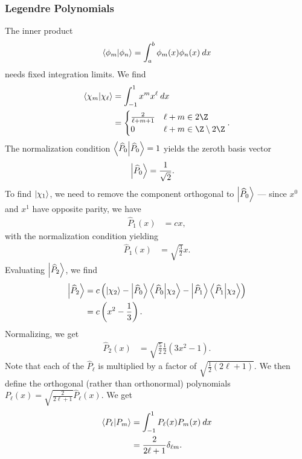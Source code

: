 \documentclass[10pt]{mypackage}
\begin{document}
\subsubsection{Legendre Polynomials}%
The inner product
\begin{align*}
  \braket{\phi_m}{\phi_n} = \int_{a}^{b} \phi_m(x)\phi_n(x)\:dx
\end{align*}
needs fixed integration limits. We find
\begin{align*}
  \braket{\chi_m}{\chi_{\ell}} &= \int_{-1}^{1} x^{m}x^{\ell}\:dx\\
                               &= \begin{cases}
                                 \frac{2}{\ell + m + 1} & \ell + m\in 2\Z\\
                                 0 & \ell + m \in \Z\setminus 2\Z
                               \end{cases}.
\end{align*}
The normalization condition $\braket{\widehat{P}_0}{\widehat{P}_0} = 1$ yields the zeroth basis vector
\begin{align*}
  \ket{\widehat{P}_0} &= \frac{1}{\sqrt{2}}.
\end{align*}
To find $\ket{\chi_1}$, we need to remove the component orthogonal to $\ket{\widehat{P}_0}$ --- since $x^0$ and $x^1$ have opposite parity, we have
\begin{align*}
  \widehat{P}_1(x) &= cx,
\end{align*}
with the normalization condition yielding
\begin{align*}
  \widehat{P}_1(x) &= \sqrt{\frac{3}{2}} x.
\end{align*}
Evaluating $\ket{\widehat{P}_2}$, we find
\begin{align*}
  \ket{\widehat{P}_2} &= c\left(\ket{\chi_2} - \ket{\widehat{P}_0}\braket{\widehat{P}_0}{\chi_2} - \ket{\widehat{P}_1}\braket{\widehat{P}_1}{\chi_2}\right)\\
                  &= c\left(x^2 - \frac{1}{3}\right).
\end{align*}
Normalizing, we get
\begin{align*}
  \widehat{P}_2(x) &= \sqrt{\frac{5}{2}}\frac{1}{2} \left(3x^2 - 1\right).
\end{align*}
Note that each of the $\widehat{P}_{\ell}$ is multiplied by a factor of $\sqrt{\frac{1}{2}\left(2\ell + 1\right)}$. We then define the orthogonal (rather than orthonormal) polynomials $P_{\ell}(x) = \sqrt{\frac{2}{2\ell + 1}}\widehat{P}_{\ell}(x)$. We get
\begin{align*}
  \braket{P_{\ell}}{P_{m}} &= \int_{-1}^{1} P_\ell(x)P_m(x)\:dx\\
                           &= \frac{2}{2\ell + 1} \delta_{\ell m}.
\end{align*}
\end{document}
